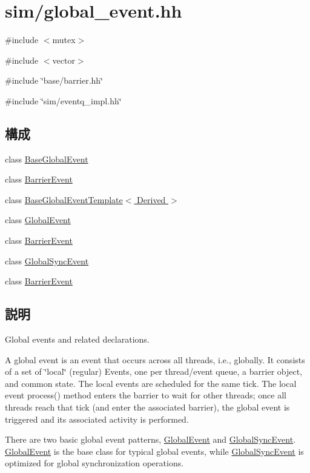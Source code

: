 \hypertarget{global__event_8hh}{
\section{sim/global\_\-event.hh}
\label{global__event_8hh}
}
{\ttfamily \#include $<$mutex$>$}\par
{\ttfamily \#include $<$vector$>$}\par
{\ttfamily \#include \char`\"{}base/barrier.hh\char`\"{}}\par
{\ttfamily \#include \char`\"{}sim/eventq\_\-impl.hh\char`\"{}}\par
\subsection*{構成}
\begin{DoxyCompactItemize}
\item 
class \hyperlink{classBaseGlobalEvent}{BaseGlobalEvent}
\item 
class \hyperlink{classBaseGlobalEvent_1_1BarrierEvent}{BarrierEvent}
\item 
class \hyperlink{classBaseGlobalEventTemplate}{BaseGlobalEventTemplate$<$ Derived $>$}
\item 
class \hyperlink{classGlobalEvent}{GlobalEvent}
\item 
class \hyperlink{classGlobalEvent_1_1BarrierEvent}{BarrierEvent}
\item 
class \hyperlink{classGlobalSyncEvent}{GlobalSyncEvent}
\item 
class \hyperlink{classGlobalSyncEvent_1_1BarrierEvent}{BarrierEvent}
\end{DoxyCompactItemize}


\subsection{説明}
Global events and related declarations.

A global event is an event that occurs across all threads, i.e., globally. It consists of a set of \char`\"{}local\char`\"{} (regular) Events, one per thread/event queue, a barrier object, and common state. The local events are scheduled for the same tick. The local event process() method enters the barrier to wait for other threads; once all threads reach that tick (and enter the associated barrier), the global event is triggered and its associated activity is performed.

There are two basic global event patterns, \hyperlink{classGlobalEvent}{GlobalEvent} and \hyperlink{classGlobalSyncEvent}{GlobalSyncEvent}. \hyperlink{classGlobalEvent}{GlobalEvent} is the base class for typical global events, while \hyperlink{classGlobalSyncEvent}{GlobalSyncEvent} is optimized for global synchronization operations. 